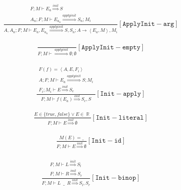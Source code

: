 \documentclass{scrartcl}
\DeclareMathOperator{\numtype}{\mathbb{R}}
\begin{document}
    \begin{align*}
    \frac{
        \begin{matrix}
        F; M \vdash E_a \overset{init}{\Rightarrow} S \\
        A_n; F; M \vdash E_{a_n} \overset{applyinit}{\Rightarrow} S_n; M_i
        \end{matrix}
    }{
        A, A_n; F; M \vdash E_a, E_{a_n} \overset{applyinit}{\Rightarrow} S, S_n; A \to \left< E_a, M \right>, M_i
    }[\mathtt{ApplyInit-arg}]
    \end{align*}
    
    \begin{align*}
    \frac{}{
        F; M \vdash \overset{applyinit}{\Rightarrow} \emptyset; \emptyset
    }[\mathtt{ApplyInit-empty}]
    \end{align*}
    
    \begin{align*}
    \frac{
        \begin{matrix}
        F(f) = \left< A, E, F_i \right> \\
        A; F; M \vdash E_a \overset{applyinit}{\Rightarrow} S; M_i \\
        F_i; M_i \vdash E \overset{init}{\Rightarrow} S_e
        \end{matrix}
    }{
        F; M \vdash f(E_a) \overset{init}{\Rightarrow} S_e, S
    }[\mathtt{Init-apply}]
    \end{align*}
    
    \begin{align*}
    \frac{
        E \in \{ true, false \} \lor E \in \numtype
    }{
        F; M \vdash E \overset{init}{\Rightarrow} \emptyset
    }[\mathtt{Init-literal}]
    \end{align*}
    
    \begin{align*}
    \frac{
        M(E) = \_
    }{
        F; M \vdash E \overset{init}{\Rightarrow} \emptyset
    }[\mathtt{Init-id}]
    \end{align*}
    
    \begin{align*}
    \frac{
        \begin{matrix}
        F; M \vdash L \overset{init}{\Rightarrow} S_l \\
        F; M \vdash R \overset{init}{\Rightarrow} S_r
        \end{matrix}
    }{
        F; M \vdash L \enspace \_ \enspace R \overset{init}{\Rightarrow} S_l, S_r
    }[\mathtt{Init-binop}]
    \end{align*}
    
\end{document}
